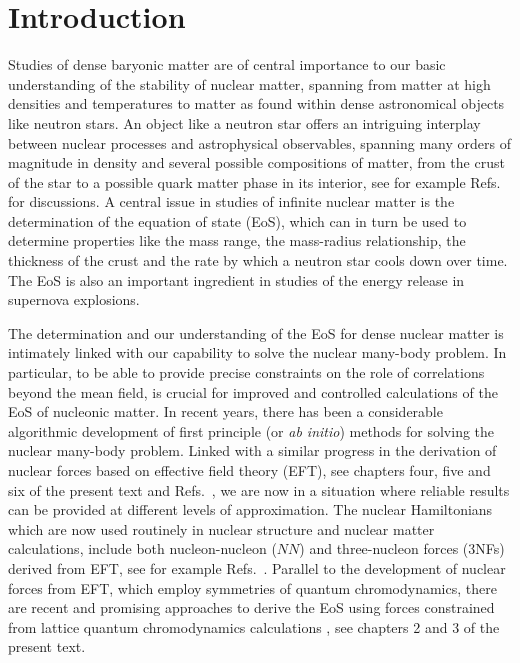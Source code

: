 \section{Introduction}\label{sec:chap8intro}


Studies of dense baryonic matter are of central importance to our
basic understanding of the stability of nuclear matter, spanning from
matter at high densities and temperatures to matter as found within
dense astronomical objects like neutron stars.  An object like a
neutron star offers an intriguing interplay between nuclear processes
and astrophysical observables, spanning many orders of magnitude in
density and several possible compositions of matter, from the crust of
the star to a possible quark matter phase in its interior, see for
example Refs.~\cite{shapiro,prakash2001,Lattimer2007,steiner2010,steiner2012,lattimer2012,weber1999,hh2000}
for discussions.  A central issue in studies of infinite nuclear
matter is the determination of the equation of state (EoS), which can
in turn be used to determine properties like the mass range, the
mass-radius relationship, the thickness of the crust and the rate by
which a neutron star cools down over time. The EoS is also an
important ingredient in studies of the energy release in supernova
explosions.

The determination and our understanding of the EoS for dense nuclear
matter is intimately linked with our capability to solve the nuclear
many-body problem. In particular, to be able to provide precise
constraints on the role of correlations beyond the mean field, is
crucial for improved and controlled calculations of the EoS of
nucleonic matter.  In recent years, there has been a considerable
algorithmic development of first principle (or {\em ab initio})
methods for solving the nuclear many-body problem. Linked with a
similar progress in the derivation of nuclear forces based on
effective field theory (EFT), see chapters four, five and six of the
present text and Refs.~\cite{vankolck1999,machleidt2011,epelbaum2009},
we are now in a situation where reliable results can be provided at
different levels of approximation.  The nuclear Hamiltonians which are
now used routinely in nuclear structure and nuclear matter
calculations, include both nucleon-nucleon ($NN$) and three-nucleon forces (3NFs) derived from EFT, see for
example
Refs.~\cite{hagen2014,hagen2016,roth2012,binder2013,hergert2016,navratil2016,steiner2012,carbone2013,steiner2012}.
Parallel to the development of nuclear forces from EFT, which employ
symmetries of quantum chromodynamics, there are recent and promising
approaches to derive the EoS using forces constrained from lattice
quantum chromodynamics calculations \cite{tetsuo2013}, see chapters 2
and 3 of the present text.


